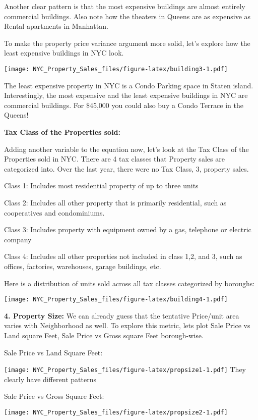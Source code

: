 \documentclass[
  a3paper,
]{article}
\begin{document}
Another clear pattern is that the most expensive buildings are almost
entirely commercial buildings. Also note how the theaters in Queens are
as expensive as Rental apartments in Manhattan.

To make the property price variance argument more solid, let's explore
how the least expensive buildings in NYC look.

\texttt{[image: NYC\_Property\_Sales\_files/figure-latex/building3-1.pdf]}

The least expensive property in NYC is a Condo Parking space in Staten
island. Interestingly, the most expensive and the least expensive
buildings in NYC are commercial buildings. For \$45,000 you could also
buy a Condo Terrace in the Queens!

\textbf{Tax Class of the Properties sold:}

Adding another variable to the equation now, let's look at the Tax Class
of the Properties sold in NYC. There are 4 tax classes that Property
sales are categorized into. Over the last year, there were no Tax Class,
3, property sales.

Class 1: Includes most residential property of up to three units

Class 2: Includes all other property that is primarily residential, such
as cooperatives and condominiums.

Class 3: Includes property with equipment owned by a gas, telephone or
electric company

Class 4: Includes all other properties not included in class 1,2, and 3,
such as offices, factories, warehouses, garage buildings, etc.

Here is a distribution of units sold across all tax classes categorized
by boroughs:

\texttt{[image: NYC\_Property\_Sales\_files/figure-latex/building4-1.pdf]}

\newpage

\textbf{4. Property Size:} We can already guess that the tentative
Price/unit area varies with Neighborhood as well. To explore this
metric, lets plot Sale Price vs Land square Feet, Sale Price vs Gross
square Feet borough-wise.

Sale Price vs Land Square Feet:

\texttt{[image: NYC\_Property\_Sales\_files/figure-latex/propsize1-1.pdf]}
They clearly have different patterns \newpage

Sale Price vs Gross Square Feet:

\texttt{[image: NYC\_Property\_Sales\_files/figure-latex/propsize2-1.pdf]}
\end{document}
